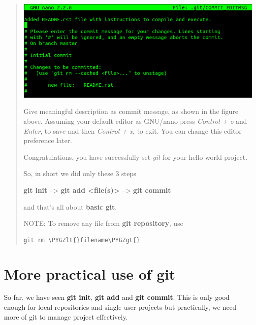 \documentclass[letterpaper,10pt,english]{sphinxmanual}
\def\PYGZlt{\char`\<}
\def\PYGZgt{\char`\>}
\begin{document}
\begin{DUlineblock}{0em}
\item[] 
\end{DUlineblock}
\begin{quote}

\includegraphics[width=1.000\linewidth]{commit-msg.png}

Give meaningful description as commit message, as shown in the figure
above. Assuming your default editor as GNU/nano press \emph{Control + o} and
\emph{Enter}, to save and then \emph{Control + x}, to exit. You can change this editor
preference later.

Congratulations, you have successfully set \emph{git} for your hello world
project.

So, in short we did only these 3 steps

\textbf{git init}  --\textgreater{}  \textbf{git add \textless{}file(s)\textgreater{}}  --\textgreater{}  \textbf{git commit}

and that's all about \textbf{basic git}.

\begin{DUlineblock}{0em}
\item[] 
\end{DUlineblock}

NOTE: To remove any file from \textbf{git repository}, use

\begin{Verbatim}[commandchars=\\\{\}]
git rm \PYGZlt{}filename\PYGZgt{}
\end{Verbatim}
\end{quote}

\begin{DUlineblock}{0em}
\item[] 
\item[] 
\end{DUlineblock}


\chapter{More practical use of git}
\label{version-control:more-practical-use-of-git}
So far, we have seen \textbf{git init}, \textbf{git add} and \textbf{git commit}. This is only
good enough for local repositories and single user projects but practically,
we need more of git to manage project effectively.
\end{document}
